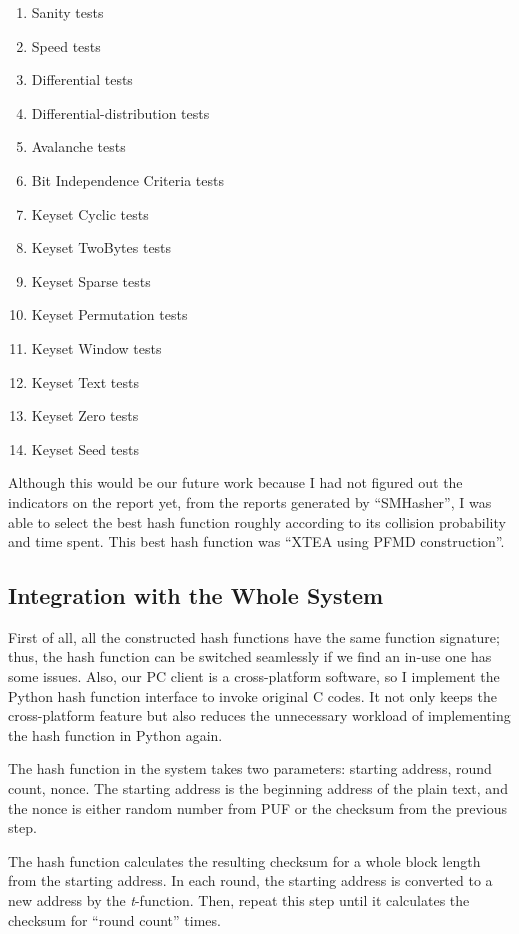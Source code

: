 \documentclass[sigconf, review=false]{acmart}
\begin{document}
\begin{enumerate}
    \item Sanity tests
    \item Speed tests
    \item Differential tests
    \item Differential-distribution tests
    \item Avalanche tests
    \item Bit Independence Criteria tests
    \item Keyset Cyclic tests
    \item Keyset TwoBytes tests
    \item Keyset Sparse tests
    \item Keyset Permutation tests
    \item Keyset Window tests
    \item Keyset Text tests
    \item Keyset Zero tests
    \item Keyset Seed tests
\end{enumerate}

Although this would be our future work because I had not figured out the indicators on the report yet,
from the reports generated by ``SMHasher'', I was able to select the best hash function roughly according to its collision probability and time spent.
This best hash function was ``XTEA using PFMD construction''.

\subsection{Integration with the Whole System} \label{sec-int}
First of all, all the constructed hash functions have the same function signature; thus, the hash function can be switched seamlessly if we find an in-use one has some issues.
Also, our PC client is a cross-platform software, so I implement the Python hash function interface to invoke original C codes.
It not only keeps the cross-platform feature but also reduces the unnecessary workload of implementing the hash function in Python again.

The hash function in the system takes two parameters: starting address, round count, nonce.
The starting address is the beginning address of the plain text, and the nonce is either random number from PUF or the checksum from the previous step.

The hash function calculates the resulting checksum for a whole block length from the starting address.
In each round, the starting address is converted to a new address by the \textit{t}-function.
Then, repeat this step until it calculates the checksum for ``round count'' times.
\end{document}
